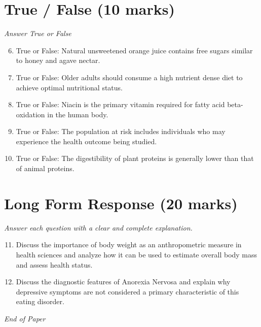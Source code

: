 \documentclass[12pt]{article}
\begin{document}
\section*{True / False (10 marks)}
\textit{Answer True or False}
\begin{enumerate}[label=\arabic*.]
\setcounter{enumi}{5}
\item True or False: Natural unsweetened orange juice contains free sugars similar to honey and agave nectar.
\item True or False: Older adults should consume a high nutrient dense diet to achieve optimal nutritional status.
\item True or False: Niacin is the primary vitamin required for fatty acid beta-oxidation in the human body.
\item True or False: The population at risk includes individuals who may experience the health outcome being studied.
\item True or False: The digestibility of plant proteins is generally lower than that of animal proteins.
\end{enumerate}

\section*{Long Form Response (20 marks)}
\textit{Answer each question with a clear and complete explanation.}
\begin{enumerate}[label=\arabic*.]
\setcounter{enumi}{10}
\item Discuss the importance of body weight as an anthropometric measure in health sciences and analyze how it can be used to estimate overall body mass and assess health status.
\item Discuss the diagnostic features of Anorexia Nervosa and explain why depressive symptoms are not considered a primary characteristic of this eating disorder.
\end{enumerate}

\vfill
\noindent\textit{End of Paper}
\end{document}

